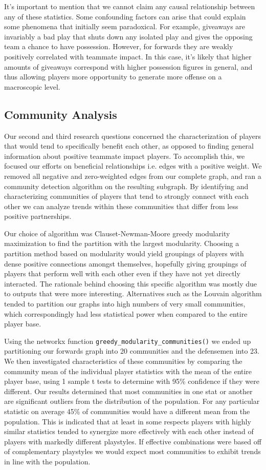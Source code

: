 \documentclass{article}
\begin{document}
It's important to mention that we cannot claim any causal relationship between any of these statistics.
Some confounding factors can arise that could explain some phenomena that initially seem paradoxical.
For example, giveaways are invariably a bad play that shuts down any isolated play and gives the opposing team a chance to have possession.
However, for forwards they are weakly positively correlated with teammate impact.
In this case, it's likely that higher amounts of giveaways correspond with higher possession figures in general, and thus allowing players more opportunity to generate more offense on a macroscopic level.

\subsection{Community Analysis}
\label{sec:community}
Our second and third research questions concerned the characterization of players that would tend to specifically benefit each other, as opposed to finding general information about positive teammate impact players.
To accomplish this, we focused our efforts on beneficial relationships i.e. edges with a positive weight.
We removed all negative and zero-weighted edges from our complete graph, and ran a community detection algorithm on the resulting subgraph.
By identifying and characterizing communities of players that tend to strongly connect with each other we can analyze trends within these communities that differ from less positive partnerships.

Our choice of algorithm was Clauset-Newman-Moore greedy modularity maximization to find the partition with the largest modularity.
Choosing a partition method based on modularity would yield groupings of players with dense positive connections amongst themselves, hopefully giving groupings of players that perform well with each other even if they have not yet directly interacted.
The rationale behind choosing this specific algorithm was mostly due to outputs that were more interesting.
Alternatives such as the Louvain algorithm tended to partition our graphs into high numbers of very small communities, which correspondingly had less statistical power when compared to the entire player base.

Using the networkx function \texttt{greedy\_modularity\_communities()} we ended up partitioning our forwards graph into 20 communities and the defensemen into 23.
We then investigated characteristics of these communities by comparing the community mean of the individual player statistics with the mean of the entire player base, using 1 sample t tests to determine with 95\% confidence if they were different.
Our results determined that most communities in one stat or another are significant outliers from the distribution of the population.
For any particular statistic on average 45\% of communities would have a different mean from the population.
This is indicated that at least in some respects players with highly similar statistics tended to synergize more effectively with each other instead of players with markedly different playstyles.
If effective combinations were based off of complementary playstyles we would expect most communities to exhibit trends in line with the population.
\end{document}
